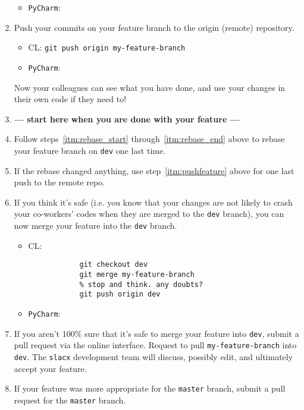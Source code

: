 \begin{enumerate}
\begin{itemize}
        \item \verb|PyCharm|:  
    \end{itemize} 
    \item Push your commits on your feature branch to the origin (remote) repository.
    \label{itm:pushfeature} 
    \begin{itemize} 
        \item CL: \verb|git push origin my-feature-branch| 
        \item \verb|PyCharm|:  
    \end{itemize} 
    Now your colleagues can see what you have done,
    and use your changes in their own code if they need to!
    \item \textbf{--- start here when you are done with your feature ---}
    \item Follow steps~\ref{itm:rebase_start} through~\ref{itm:rebase_end} above
    to rebase your feature branch on \verb|dev| one last time.
    \item If the rebase changed anything, 
    use step~\ref{itm:pushfeature} 
    above for one last push to the remote repo.
    \item If you think it's safe 
    (i.e. you know that your changes 
    are not likely to crash your co-workers' codes 
    when they are merged to the \verb|dev| branch), 
    you can now merge your feature into the \verb|dev| branch.
    \begin{itemize} 
        \item CL: 
        \begin{lstlisting}
            git checkout dev 
            git merge my-feature-branch 
            % stop and think. any doubts? 
            git push origin dev
        \end{lstlisting}
        \item \verb|PyCharm|:  
    \end{itemize} 
    \item If you aren't 100\% sure that it's safe to merge your feature into \verb|dev|,
    submit a pull request via the online interface.
    Request to pull \verb|my-feature-branch| into \verb|dev|.
    The \verb|slacx| development team will discuss, possibly edit, 
    and ultimately accept your feature.
    \item If your feature was more appropriate for the \verb|master| branch,
    submit a pull request for the \verb|master| branch.
\end{enumerate} 

